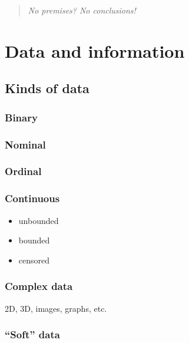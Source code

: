 \documentclass[
  letterpaper,
  DIV=11,
  numbers=noendperiod,
  oneside]{scrreprt}
\begin{document}
\begin{quote}
\emph{No premises? No conclusions!}
\end{quote}


\hypertarget{data-and-information}{%
\chapter{Data and information}\label{data-and-information}}

\hypertarget{kinds-of-data}{%
\section{Kinds of data}\label{kinds-of-data}}

\hypertarget{binary}{%
\subsection{Binary}\label{binary}}

\hypertarget{nominal}{%
\subsection{Nominal}\label{nominal}}

\hypertarget{ordinal}{%
\subsection{Ordinal}\label{ordinal}}

\hypertarget{continuous}{%
\subsection{Continuous}\label{continuous}}

\begin{itemize}
\item
  unbounded
\item
  bounded
\item
  censored
\end{itemize}

\hypertarget{complex-data}{%
\subsection{Complex data}\label{complex-data}}

2D, 3D, images, graphs, etc.

\hypertarget{soft-data}{%
\subsection{``Soft'' data}\label{soft-data}}
\end{document}
